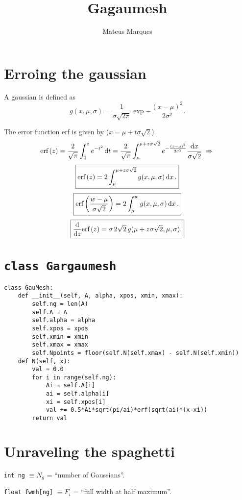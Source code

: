 \documentclass[a4paper,fleqn,12pt]{article}
\title{\Huge{\textbf{Gagaumesh}}}
\author{Mateus Marques}
\begin{document}
\maketitle

\section{Erroing the gaussian}

A gaussian is defined as
$$
g(x, \mu, \sigma) = \frac{1}{\sigma \sqrt{2\pi}} \exp{-\frac{(x-\mu)^2}{2 \sigma^2}}.
$$

The error function erf is given by ($x = \mu + t\sigma \sqrt{2}$).
$$
\text{erf}\left(z\right) = \frac{2}{\sqrt{\pi}} \int_0^z e^{-t^2} \dd{t} =
\frac{2}{\sqrt{\pi}} \int_\mu^{\mu + z \sigma \sqrt{2}}
e^{-\frac{(x-\mu)^2}{2\sigma^2}} \frac{\dd{x}}{\sigma \sqrt{2}} \; \Rightarrow \;
$$
$$
\boxed{
\text{erf}\left(z\right) = 2 \int_\mu^{\mu+z\sigma\sqrt{2}} g(x, \mu, \sigma) \dd{x}. }
$$
$$
\boxed{
\text{erf}\left(\frac{w-\mu}{\sigma\sqrt{2}}\right) = 2 \int_\mu^{w} g(x, \mu, \sigma) \dd{x}. }
$$
$$
\boxed{
\dv{z} \text{erf}\left(z\right) = \sigma \, 2\sqrt{2} \, g(\mu + z\sigma\sqrt{2}, \mu, \sigma).}
$$


\section{\texttt{class Gargaumesh}}

\begin{verbatim}
class GauMesh:
    def __init__(self, A, alpha, xpos, xmin, xmax):
        self.ng = len(A)
        self.A = A
        self.alpha = alpha
        self.xpos = xpos
        self.xmin = xmin
        self.xmax = xmax
        self.Npoints = floor(self.N(self.xmax) - self.N(self.xmin))
    def N(self, x):
        val = 0.0
        for i in range(self.ng):
            Ai = self.A[i]
            ai = self.alpha[i]
            xi = self.xpos[i]
            val += 0.5*Ai*sqrt(pi/ai)*erf(sqrt(ai)*(x-xi))
        return val
\end{verbatim}

\pagebreak

\section{Unraveling the spaghetti}

\texttt{int ng} $\equiv N_g$ = ``number of Gaussians''.

\texttt{float fwmh[ng]} $\equiv F_i$ =  ``full width at half maximum''.
\end{document}
